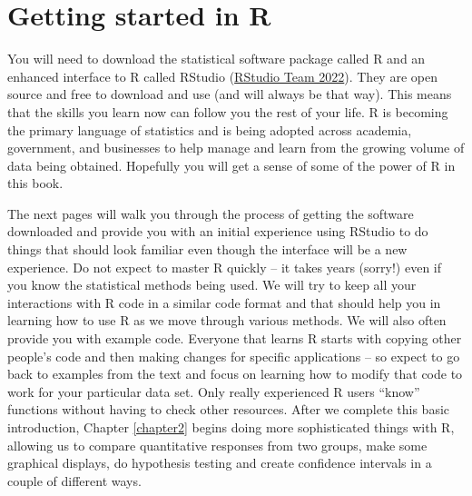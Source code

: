 \documentclass[
]{book}
\begin{document}
\hypertarget{section1-2}{%
\section{Getting started in R}\label{section1-2}}

You will need to download the statistical software package called R and an enhanced interface to R called
RStudio (\protect\hyperlink{ref-RStudio}{RStudio Team 2022}). They are open source and free to download and use
(and will always be that way). This means that the skills you learn now can
follow you the rest of your life. R is becoming the primary language of
statistics and is being adopted across academia, government, and businesses to
help manage and learn from the growing volume of data being obtained. Hopefully
you will get a sense of some of the power of R in this book.

\indent The next pages will walk you through the process of getting the software downloaded and provide you with
an initial experience using RStudio to do things that should look familiar
even though the interface will be a new experience. Do not expect to master R
quickly -- it takes years (sorry!) even if you know the statistical methods
being used. We will try to keep all your interactions with R code in a similar
code format and that should help you in learning how to use R as we move
through various methods. We will also often provide you with example code. Everyone
that learns R starts with copying other people's code and then making changes
for specific applications -- so expect to go back to examples from the text and focus
on learning how to modify that code to work for your particular data set. Only
really experienced R users ``know'' functions without having to check other
resources. After we complete this basic introduction, Chapter \ref{chapter2} begins doing
more sophisticated things with R, allowing us to compare quantitative responses
from two groups, make some graphical displays, do hypothesis testing  and create
confidence intervals in a couple of different ways.
\end{document}

